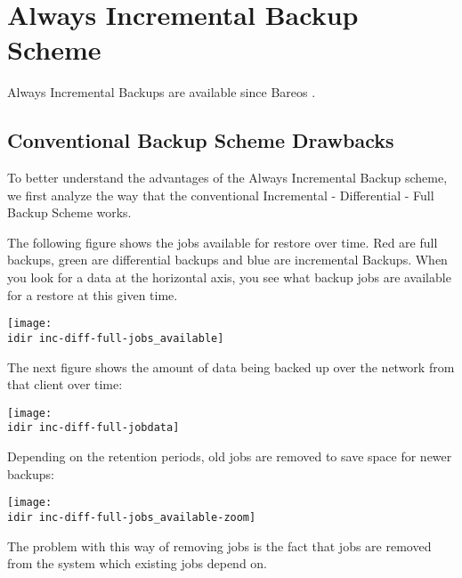 \chapter{Always Incremental Backup Scheme}
\label{sec:alwaysincremental}

Always Incremental Backups are available since Bareos .

\section{Conventional Backup Scheme Drawbacks}


To better understand the advantages of the Always Incremental Backup scheme, we first analyze the way that the conventional Incremental - Differential - Full Backup Scheme works.

The following figure shows the jobs available for restore over time. Red are full backups, green are differential backups and blue are incremental Backups. When you look for a data at the horizontal axis, you see what backup jobs are available for a restore at this given time.

\begin{center}
\texttt{[image: \\idir inc-diff-full-jobs\_available]}
\end{center}


The next figure shows the amount of data being backed up over the network from that client over time:

\begin{center}
\texttt{[image: \\idir inc-diff-full-jobdata]}
\end{center}


Depending on the retention periods, old jobs are removed to save space for newer backups:

\begin{center}
\texttt{[image: \\idir inc-diff-full-jobs\_available-zoom]}
\end{center}

The problem with this way of removing jobs is the fact that jobs are removed from the system which existing jobs depend on.



